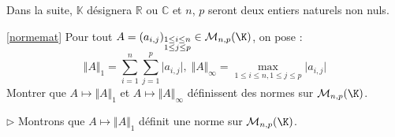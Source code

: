 \documentclass[a4paper,10pt]{report}
\begin{document}
\everymath{\displaystyle}

\begin{center}
\end{center}


\bigskip

\noindent Dans la suite, $\mathbb{K}$ désignera $\mathbb{R}$ ou $\mathbb{C}$ et $n$, $p$ seront deux entiers naturels non nuls.

\medskip

\begin{Exa}\ref{normemat} Pour tout $A = (a_{i,j})_{\substack{1 \leq i \leq n \\ 1 \leq j \leq p}} \in \mathcal{M}_{n,p}(\K)$, on pose :
$$\Vert A \Vert_{1}  = \sum_{i = 1}^{n} \sum_{j = 1}^{p} \vert a_{i,j} \vert, \; \Vert A \Vert_{\infty}  = \max_{1 \leq i \leq n,1 \leq j \leq p} \vert a_{i,j} \vert $$
Montrer que $A \mapsto \Vert A \Vert_{1}$ et $A \mapsto \Vert A \Vert_{\infty}$ définissent des normes sur $\mathcal{M}_{n,p}(\K)$.
\end{Exa}

\corr 

\noindent $\rhd$ Montrons que $A \mapsto \Vert A \Vert_{1}$ définit une norme sur $\mathcal{M}_{n,p}(\K)$.
\end{document}
